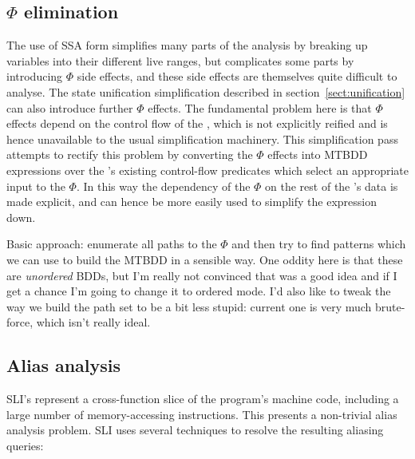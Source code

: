 \subsection{$\Phi$ elimination}
\label{sect:phi_elimination}

The use of SSA form simplifies many parts of the analysis by breaking
up variables into their different live ranges, but complicates some
parts by introducing $\Phi$ side effects, and these side effects are
themselves quite difficult to analyse.  The state unification
simplification described in section~\ref{sect:unification} can also
introduce further $\Phi$ effects.  The fundamental problem here is
that $\Phi$ effects depend on the control flow of the {\StateMachine},
which is not explicitly reified and is hence unavailable to the usual
simplification machinery.  This simplification pass attempts to
rectify this problem by converting the $\Phi$ effects into
MTBDD\needCite{} expressions over the {\StateMachine}'s existing
control-flow predicates which select an appropriate input to the
$\Phi$.  In this way the dependency of the $\Phi$ on the rest of the
{\StateMachine}'s data is made explicit, and can hence be more easily
used to simplify the expression down.

Basic approach: enumerate all paths to the $\Phi$ and then try to find
patterns which we can use to build the MTBDD in a sensible way.  One
oddity here is that these are \emph{unordered} BDDs, but I'm really
not convinced that was a good idea and if I get a chance I'm going to
change it to ordered mode.  I'd also like to tweak the way we build
the path set to be a bit less stupid: current one is very much
brute-force, which isn't really ideal.

\subsection{Alias analysis}
\label{sect:alias_analysis}


SLI's {\StateMachines} represent a cross-function slice of the
program's machine code, including a large number of memory-accessing
instructions.  This presents a non-trivial alias analysis problem.
SLI uses several techniques to resolve the resulting aliasing queries:

